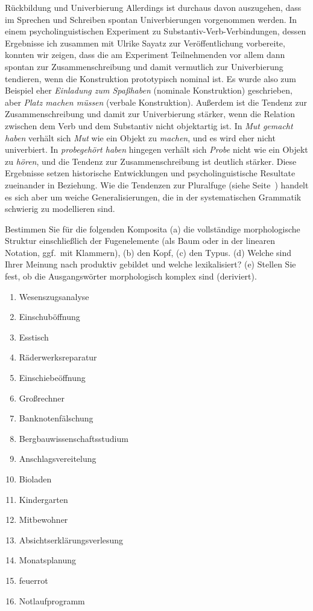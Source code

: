 \begin{Vertiefung}{Rückbildung und Univerbierung}
Allerdings ist durchaus davon auszugehen, dass im Sprechen und Schreiben spontan Univerbierungen vorgenommen werden.
In einem psycholinguistischen Experiment zu Substantiv-Verb-Verbindungen, dessen Ergebnisse ich zusammen mit Ulrike Sayatz zur Veröffentlichung vorbereite, konnten wir zeigen, dass die am Experiment Teilnehmenden vor allem dann spontan zur Zusammenschreibung und damit vermutlich zur Univerbierung tendieren, wenn die Konstruktion prototypisch nominal ist.
Es wurde also zum Beispiel eher \textit{Einladung zum Spaßhaben} (nominale Konstruktion) geschrieben, aber \textit{Platz machen müssen} (verbale Konstruktion).
Außerdem ist die Tendenz zur Zusammenschreibung und damit zur Univerbierung stärker, wenn die Relation zwischen dem Verb und dem Substantiv nicht objektartig ist.
In \textit{Mut gemacht haben} verhält sich \textit{Mut} wie ein Objekt zu \textit{machen}, und es wird eher nicht univerbiert.
In \textit{probegehört haben} hingegen verhält sich \textit{Probe} nicht wie ein Objekt zu \textit{hören}, und die Tendenz zur Zusammenschreibung ist deutlich stärker.
Diese Ergebnisse setzen historische Entwicklungen und psycholinguistische Resultate zueinander in Beziehung.
Wie die Tendenzen zur Pluralfuge (siehe Seite~\pageref{abs:weich}) handelt es sich aber um weiche Generalisierungen, die in der systematischen Grammatik schwierig zu modellieren sind.

\end{Vertiefung}

\Uebungen

 \label{exc:wortbildung01} Bestimmen Sie für die folgenden Komposita (a) die vollständige morphologische Struktur einschließlich der Fugenelemente (als Baum oder in der linearen Notation, ggf.\ mit Klammern), (b) den Kopf, (c) den Typus. (d) Welche sind Ihrer Meinung nach produktiv gebildet und welche lexikalisiert? (e) Stellen Sie fest, ob die Ausgangswörter morphologisch komplex sind (\zB deriviert).

\begin{enumerate}
  \item Wesenszugsanalyse
  \item Einschuböffnung
  \item Esstisch
  \item Räderwerksreparatur
  \item Einschiebeöffnung
  \item Großrechner
  \item Banknotenfälschung
  \item Bergbauwissenschaftsstudium
  \item Anschlagsvereitelung
  \item Bioladen
  \item Kindergarten
  \item Mitbewohner
  \item Absichtserklärungsverlesung
  \item Monatsplanung
  \item feuerrot
  \item Notlaufprogramm
\end{enumerate}

